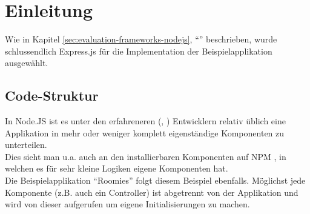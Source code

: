 \section{Einleitung}

Wie in Kapitel \ref{sec:evaluation-frameworks-nodejs}, ``'' beschrieben, wurde schlussendlich Express.js \cite{Expressjs} für
die Implementation der Beispielapplikation ausgewählt.

\subsection{Code-Struktur}
In Node.JS ist es unter den erfahreneren (\cite{TJH_ComponentStructure}, \cite{IZS_ComponentStructure}) Entwicklern relativ üblich eine Applikation in mehr oder weniger komplett eigenständige Komponenten zu unterteilen.\\
Dies sieht man u.a. auch an den installierbaren Komponenten auf NPM \cite{NPM}, in welchen es für sehr kleine Logiken eigene Komponenten hat.\\
Die Beispielapplikation ``Roomies'' folgt diesem Beispiel ebenfalls. Möglichst jede Komponente (z.B. auch ein Controller) ist abgetrennt von der Applikation und wird von dieser aufgerufen um eigene Initialisierungen zu machen.\\[0.5mm]

